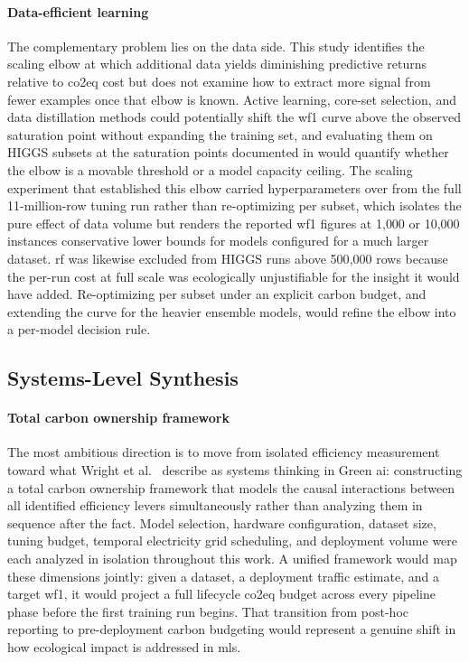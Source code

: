 \paragraph{Data-efficient learning}
The complementary problem lies on the data side. This study identifies the scaling elbow at which additional data yields diminishing predictive returns relative to \gls{co2eq} cost but does not examine how to extract more signal from fewer examples once that elbow is known. Active learning, core-set selection, and data distillation methods could potentially shift the \gls{wf1} curve above the observed saturation point without expanding the training set, and evaluating them on HIGGS subsets at the saturation points documented in  would quantify whether the elbow is a movable threshold or a model capacity ceiling. The scaling experiment that established this elbow carried hyperparameters over from the full 11-million-row tuning run rather than re-optimizing per subset, which isolates the pure effect of data volume but renders the reported \gls{wf1} figures at 1{,}000 or 10{,}000 instances conservative lower bounds for models configured for a much larger dataset. \gls{rf} was likewise excluded from HIGGS runs above 500{,}000 rows because the per-run cost at full scale was ecologically unjustifiable for the insight it would have added. Re-optimizing per subset under an explicit carbon budget, and extending the curve for the heavier ensemble models, would refine the elbow into a per-model decision rule.

\subsection{Systems-Level Synthesis}

\paragraph{Total carbon ownership framework}
The most ambitious direction is to move from isolated efficiency measurement toward what Wright et al.\ \parencite{wrightEfficiencyNotEnough2025} describe as systems thinking in Green \gls{ai}: constructing a total carbon ownership framework that models the causal interactions between all identified efficiency levers simultaneously rather than analyzing them in sequence after the fact. Model selection, hardware configuration, dataset size, tuning budget, temporal electricity grid scheduling, and deployment volume were each analyzed in isolation throughout this work. A unified framework would map these dimensions jointly: given a dataset, a deployment traffic estimate, and a target \gls{wf1}, it would project a full lifecycle \gls{co2eq} budget across every pipeline phase before the first training run begins. That transition from post-hoc reporting to pre-deployment carbon budgeting would represent a genuine shift in how ecological impact is addressed in \glspl{ml}.

